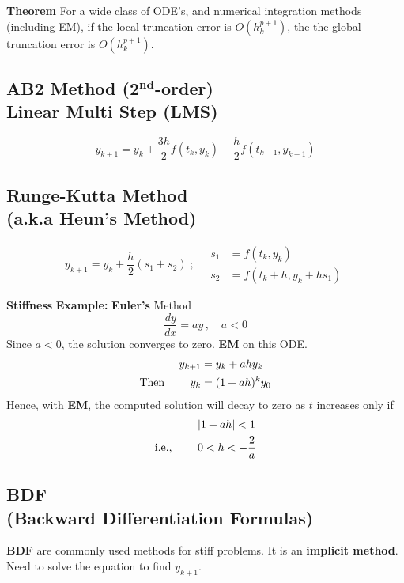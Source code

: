 \documentclass[9pt]{article}
\begin{document}
\begin{multicols}{3}
\textbf{Theorem} For a wide class of ODE's, and numerical integration methods (including EM), if the local truncation error is $O(h_k^{p+1})$, the the global truncation error is $O(h_k^{p+1})$.

\hdashrule{\linewidth}{0.5pt}{1mm 1mm}

\vspace{-0.4cm}
\subsection*{AB2 Method (2$^{\mathbf{nd}}$-order)\\
\footnotesize{Linear Multi Step (LMS)}}
\[
y_{k+1} = y_k + \frac{3h}{2}f(t_k,y_k) - \frac{h}{2}f(t_{k-1}, y_{k-1})
\]

\columnbreak
\subsection*{Runge-Kutta Method\\ \footnotesize{(a.k.a Heun's Method)}}
\[
y_{k+1}=y_k + \frac{h}{2}(s_1 + s_2)
\; ; \quad
\begin{aligned}
s_1 &= f(t_k, y_k)\\
s_2 &= f(t_k+h,y_k+hs_1)
\end{aligned}
\]

\textbf{Stiffness}
\textbf{Example: } \textbf{Euler's} Method
\[
\frac{dy}{dx} = ay\, , \quad a < 0 
\]
Since $a<0$, the solution converges to zero.
\textbf{EM} on this ODE.
\[
\begin{aligned}
    y_{k+1} &= y_k + ahy_k\\
    \text{Then \qquad} y_k &= (1+ah)^ky_0
\end{aligned}
\]
Hence, with \textbf{EM}, the computed solution will decay to zero as $t$ increases only if 
\[
\begin{aligned}
&|1+ah|< 1\\
\text{i.e., \qquad} &0 < h <-\frac{2}{a}
\end{aligned}
\]

\hdashrule{\linewidth}{0.5pt}{1mm 1mm}
\vspace{-0.7cm}
\subsection*{BDF\\ \footnotesize{(Backward Differentiation Formulas)}}
\textbf{BDF} are commonly used methods for stiff problems.
It is an \textbf{implicit method}. Need to solve the equation to find $y_{k+1}$.\\


\end{multicols}
\end{document}
